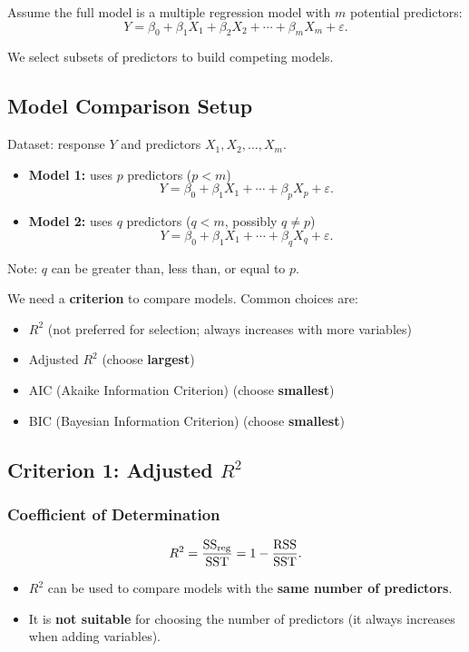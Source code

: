 Assume the full model is a multiple regression model with $m$ potential predictors:
\[
Y = \beta_0 + \beta_1 X_1 + \beta_2 X_2 + \cdots + \beta_m X_m + \varepsilon.
\]

We select subsets of predictors to build competing models.

\subsection{Model Comparison Setup}

Dataset: response $Y$ and predictors $X_1, X_2, \dots, X_m$.

\begin{itemize}
\item \textbf{Model 1:} uses $p$ predictors ($p < m$)
\[
Y = \beta_0 + \beta_1 X_1 + \cdots + \beta_p X_p + \varepsilon.
\]

\item \textbf{Model 2:} uses $q$ predictors ($q < m$, possibly $q \neq p$)
\[
Y = \beta_0 + \beta_1 X_1 + \cdots + \beta_q X_q + \varepsilon.
\]
\end{itemize}

Note: $q$ can be greater than, less than, or equal to $p$.

We need a \textbf{criterion} to compare models. Common choices are:

\begin{itemize}
\item $R^2$ (not preferred for selection; always increases with more variables)
\item Adjusted $R^2$ (choose \textbf{largest})
\item AIC (Akaike Information Criterion) (choose \textbf{smallest})
\item BIC (Bayesian Information Criterion) (choose \textbf{smallest})
\end{itemize}

\subsection{Criterion 1: Adjusted $R^2$}

\subsubsection*{Coefficient of Determination}

\begin{keyresult}[R-squared]
\[
R^2 = \frac{\mathrm{SS}_{\mathrm{reg}}}{\mathrm{SST}} = 1 - \frac{\mathrm{RSS}}{\mathrm{SST}}.
\]

\begin{itemize}
\item $R^2$ can be used to compare models with the \textbf{same number of predictors}.
\item It is \textbf{not suitable} for choosing the number of predictors (it always increases when adding variables).
\end{itemize}
\end{keyresult}

